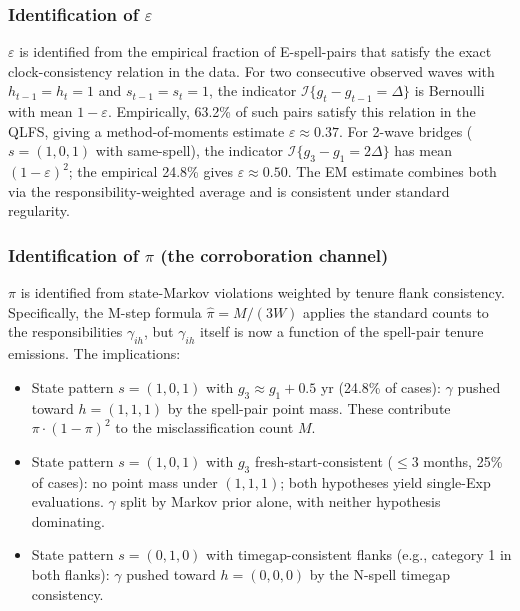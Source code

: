 \subsubsection{Identification of \(\varepsilon\)}

\(\varepsilon\) is identified from the empirical fraction of E-spell-pairs
that satisfy the exact clock-consistency relation in the data. For two
consecutive observed waves with \(h_{t-1}=h_t=1\) and \(s_{t-1}=s_t=1\),
the indicator \(\mathcal{I}\{g_t - g_{t-1} = \Delta\}\) is Bernoulli with
mean \(1-\varepsilon\). Empirically, 63.2\% of such pairs satisfy this
relation in the QLFS, giving a method-of-moments estimate \(\varepsilon \approx 0.37\).
For 2-wave bridges (\(s=(1,0,1)\) with same-spell), the indicator
\(\mathcal{I}\{g_3 - g_1 = 2\Delta\}\) has mean \((1-\varepsilon)^2\); the
empirical 24.8\% gives \(\varepsilon \approx 0.50\). The EM estimate
combines both via the responsibility-weighted average and is consistent
under standard regularity.

\subsubsection{Identification of \(\pi\) (the corroboration channel)}

\(\pi\) is identified from state-Markov violations weighted by tenure
flank consistency. Specifically, the M-step formula \(\hat\pi = M / (3W)\)
applies the standard counts to the responsibilities \(\gamma_{ih}\), but
\(\gamma_{ih}\) itself is now a function of the spell-pair tenure
emissions. The implications:

\begin{itemize}
\item State pattern \(s=(1,0,1)\) with \(g_3 \approx g_1 + 0.5\) yr
  (24.8\% of cases): \(\gamma\) pushed toward \(h=(1,1,1)\) by the spell-pair
  point mass. These contribute \(\pi \cdot (1-\pi)^2\) to the misclassification
  count \(M\).
\item State pattern \(s=(1,0,1)\) with \(g_3\) fresh-start-consistent
  (\(\le 3\) months, 25\% of cases): no point mass under \((1,1,1)\); both
  hypotheses yield single-Exp evaluations. \(\gamma\) split by Markov prior
  alone, with neither hypothesis dominating.
\item State pattern \(s=(0,1,0)\) with timegap-consistent flanks (e.g.,
  category 1 in both flanks): \(\gamma\) pushed toward \(h=(0,0,0)\) by the
  N-spell timegap consistency.
\end{itemize}


